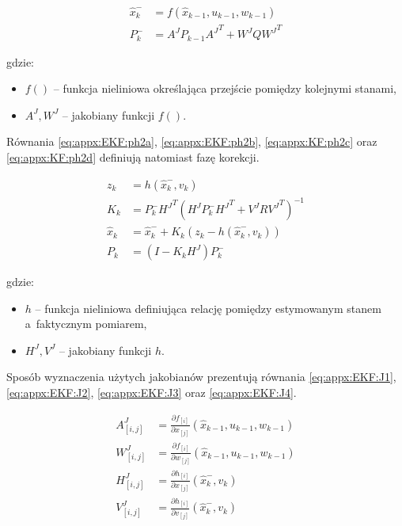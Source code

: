 \begin{subequations}
	\begin{align}
		\widehat{x}^-_k & = f(\widehat{x}_{k-1}, u_{k-1}, w_{k-1})\label{eq:appx:EKF:ph1a} \\
		P^-_k           & = A^J P_{k-1} {A^J}^T + W^J Q {W^J}^T \label{eq:appx:EKF:ph1b}   
	\end{align}
\end{subequations}
		
gdzie:
\begin{itemize}
	\item $f()$ -- funkcja nieliniowa określająca przejście pomiędzy kolejnymi stanami,
	\item $A^J , W^J$ -- jakobiany funkcji $f()$.
\end{itemize}
		
Równania \ref{eq:appx:EKF:ph2a}, \ref{eq:appx:EKF:ph2b}, \ref{eq:appx:KF:ph2c} oraz \ref{eq:appx:KF:ph2d} definiują natomiast fazę korekcji.
		
\begin{subequations}
	\begin{align}
		z_k           & = h(\widehat{x}^-_k, v_k) \label{eq:appx:EKF:ph2a}                                 \\
		K_k           & = P^-_{k}{H^J}^T(H^J P^-_{k}{H^J}^T + V^J R {V^J}^T)^{-1} \label{eq:appx:EKF:ph2b} \\
		\widehat{x}_k & = \widehat{x}^-_k + K_{k}(z_k-h(\widehat{x}^-_k, v_k))  \label{eq:appx:EKF:ph2c}   \\
		P_k           & = (I-K_{k}H^J)P^-_k \label{eq:appx:EKF:ph2d}                                       
	\end{align}
\end{subequations}
		
gdzie:
\begin{itemize}
	\item $h$ -- funkcja nieliniowa definiująca relację pomiędzy estymowanym stanem a~faktycznym pomiarem,
	\item $H^J, V^J$ -- jakobiany funkcji $h$.
\end{itemize}
		
Sposób wyznaczenia użytych jakobianów prezentują równania \ref{eq:appx:EKF:J1}, \ref{eq:appx:EKF:J2}, \ref{eq:appx:EKF:J3} oraz \ref{eq:appx:EKF:J4}.
		
\begin{subequations}
	\begin{align}
		A^J_{[i, j]} & = \frac{\partial f_{[i]}}{\partial x_{[j]}}(\widehat{x}_{k-1}, u_{k-1}, w_{k-1}) \label{eq:appx:EKF:J1} \\
		W^J_{[i, j]} & = \frac{\partial f_{[i]}}{\partial w_{[j]}}(\widehat{x}_{k-1}, u_{k-1}, w_{k-1}) \label{eq:appx:EKF:J2} \\
		H^J_{[i, j]} & = \frac{\partial h_{[i]}}{\partial x_{[j]}}(\widehat{x}^-_k, v_k) \label{eq:appx:EKF:J3}                \\
		V^J_{[i, j]} & = \frac{\partial h_{[i]}}{\partial v_{[j]}}(\widehat{x}^-_k, v_k) \label{eq:appx:EKF:J4}                
	\end{align}
\end{subequations}
		
